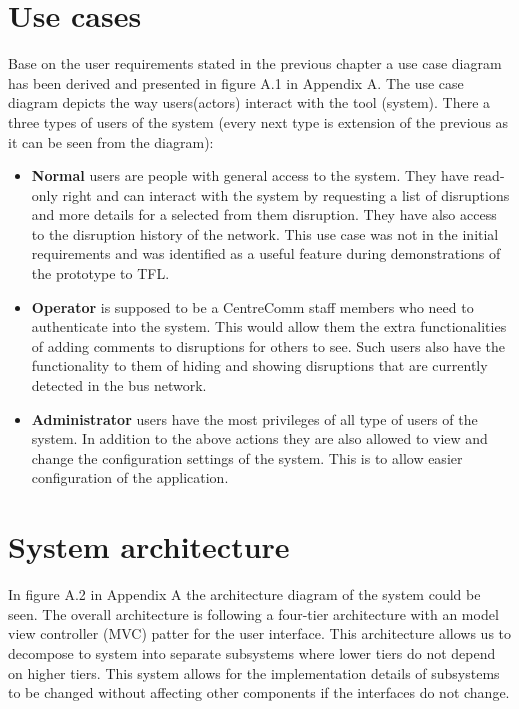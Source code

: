 \section{Use cases}
Base on the user requirements stated in the previous chapter a use case diagram has been derived and presented in figure A.1 in Appendix A. The use case diagram depicts the way users(actors) interact with the tool (system). There a three types of users of the system (every next type is extension of the previous as it can be seen from the diagram):
\begin{itemize}
	\item \textbf{Normal} users are people with general access to the system. They have read-only right and can interact with the system by requesting a list of disruptions and more details for a selected from them disruption. They have also access to the disruption history of the network. This use case was not in the initial requirements and was identified as a useful feature during demonstrations of the prototype to TFL.
	\item \textbf{Operator} is supposed to be a CentreComm staff members who need to authenticate into the system. This would allow them the extra functionalities of adding comments to disruptions for others to see. Such users also have the functionality to them of hiding and showing disruptions that are currently detected in the bus network.
	\item \textbf{Administrator} users have the most privileges of all type of users of the system. In addition to the above actions they are also allowed to view and change the configuration settings of the system. This is to allow easier configuration of the application.
\end{itemize}

\section{System architecture}
In figure A.2 in Appendix A the architecture diagram of the system could be seen. The overall architecture is following a four-tier architecture with an model view controller (MVC) patter for the user interface. This architecture allows us to decompose to system into separate subsystems where lower tiers do not depend on higher tiers. This system allows for the implementation details of subsystems to be changed without affecting other components if the interfaces do not change.


